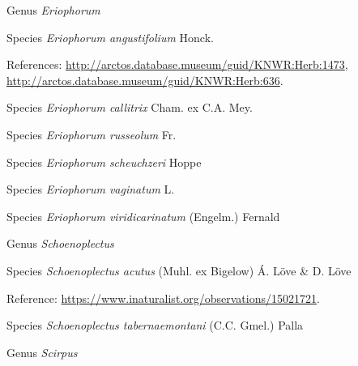 \documentclass[9pt, article]{memoir}
\begin{document}
\begin{multicols}{2}
\vspace{6pt}\noindent\hspace{30pt}Genus \textit{Eriophorum}


\vspace{6pt}\noindent\hspace{36pt}Species \textit{Eriophorum angustifolium} Honck.


\vspace{6pt}References: 
\url{http://arctos.database.museum/guid/KNWR:Herb:1473}, 
\url{http://arctos.database.museum/guid/KNWR:Herb:636}.

\vspace{6pt}\noindent\hspace{36pt}Species \textit{Eriophorum callitrix} Cham. ex C.A. Mey.


\vspace{6pt}\noindent\hspace{36pt}Species \textit{Eriophorum russeolum} Fr.


\vspace{6pt}\noindent\hspace{36pt}Species \textit{Eriophorum scheuchzeri} Hoppe


\vspace{6pt}\noindent\hspace{36pt}Species \textit{Eriophorum vaginatum} L.


\vspace{6pt}\noindent\hspace{36pt}Species \textit{Eriophorum viridicarinatum} (Engelm.) Fernald


\vspace{6pt}\noindent\hspace{30pt}Genus \textit{Schoenoplectus}


\vspace{6pt}\noindent\hspace{36pt}Species \textit{Schoenoplectus acutus} (Muhl. ex Bigelow) Á. Löve \& D. Löve


\vspace{6pt}Reference: 
\url{https://www.inaturalist.org/observations/15021721}.

\vspace{6pt}\noindent\hspace{36pt}Species \textit{Schoenoplectus tabernaemontani} (C.C. Gmel.) Palla


\vspace{6pt}\noindent\hspace{30pt}Genus \textit{Scirpus}



\end{multicols}
\end{document}
